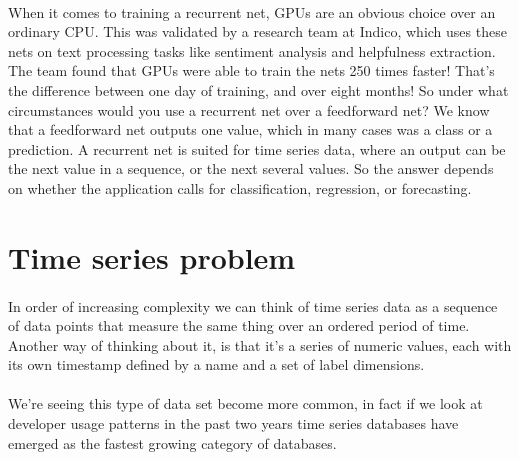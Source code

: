 \documentclass{article}
\begin{document}
    \paragraph{}
    When it comes to training a recurrent net,  GPUs are an obvious choice over an ordinary  CPU. This was validated by a research team  at Indico, which uses these nets on text processing  tasks like sentiment analysis and helpfulness  extraction. The team found that GPUs were  able to train the nets 250 times faster! That’s  the difference between one day of training,  and over eight months!  So under what circumstances would you use  a recurrent net over a feedforward net? We  know that a feedforward net outputs one value,  which in many cases was a class or a prediction.  A recurrent net is suited for time series  data, where an output can be the next value  in a sequence, or the next several values.  So the answer depends on whether the application  calls for classification, regression, or forecasting.

    \newpage
    \section{Time series problem}
    \paragraph{}
    In order of increasing complexity we can think of time series data as a sequence of data points that measure the same thing over an ordered period of time. Another way of thinking about it, is that it's a series of numeric values, each with its own timestamp defined by a name and a set of label dimensions.
    \paragraph{} 
    We're seeing this type of data set become more common, in fact if we look at developer usage patterns in the past two years time series databases have emerged as the fastest growing category of databases.
    
    
    
\end{document}
